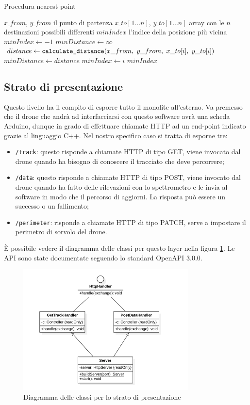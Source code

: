 \begin{algorithm}
    \caption{Procedura nearest point}
    \label{alg:nearest_point}
    \begin{algorithmic}
        \Require $x\_from$, $y\_from$ il punto di partenza
        \Require $x\_to[1 \dotso n]$, $y\_to[1 \dotso n]$ array con le $n$ destinazioni possibili differenti
        \Ensure $minIndex$ l'indice della posizione più vicina
        \State $minIndex \leftarrow -1$
        \State $minDistance \leftarrow \infty$
            \State $distance \leftarrow \verb|calculate_distance|(x\_from,\  y\_from,\  x\_to[i],\  y\_to[i])$
                \State $minDistance \leftarrow distance$
                \State $minIndex \leftarrow i$
            \EndIf
        \EndFor
        \State \Return $minIndex$
    \end{algorithmic}
\end{algorithm}

\subsection{Strato di presentazione}
Questo livello ha il compito di esporre tutto il monolite all'esterno.
Va premesso che il drone che andrà ad interfacciarsi con questo software avrà una scheda Arduino, dunque in grado di effettuare chiamate HTTP ad un end-point indicato grazie al linguaggio C++.
Nel nostro specifico caso si tratta di esporne tre:
\begin{itemize}
    \item \verb|/track|: questo risponde a chiamate HTTP di tipo GET, viene invocato dal drone quando ha bisogno di conoscere il tracciato che deve percorrere;
    \item \verb|/data|: questo risponde a chiamate HTTP di tipo POST, viene invocato dal drone quando ha fatto delle rilevazioni con lo spettrometro e le invia al software in modo che il percorso di aggiorni. La risposta può essere un successo o un fallimento;
    \item \verb|/perimeter|: risponde a chiamate HTTP di tipo PATCH, serve a impostare il perimetro di sorvolo del drone.
\end{itemize}
È possibile vedere il diagramma delle classi per questo layer nella figura \ref{fig:class_diagram_presentation}. Le API sono state documentate seguendo lo standard OpenAPI 3.0.0.

\begin{figure}
    \centering
    \includegraphics[width=0.8\textwidth]{immagini/presentation_classes.png}
    \caption{Diagramma delle classi per lo strato di presentazione}
    \label{fig:class_diagram_presentation}
\end{figure}